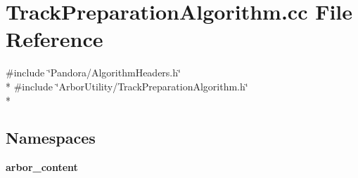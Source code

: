 \section{Track\+Preparation\+Algorithm.\+cc File Reference}
\label{TrackPreparationAlgorithm_8cc}
{\ttfamily \#include \char`\"{}Pandora/\+Algorithm\+Headers.\+h\char`\"{}}\\*
{\ttfamily \#include \char`\"{}Arbor\+Utility/\+Track\+Preparation\+Algorithm.\+h\char`\"{}}\\*
\subsection*{Namespaces}
\begin{DoxyCompactItemize}
\item 
 {\bf arbor\+\_\+content}
\end{DoxyCompactItemize}
